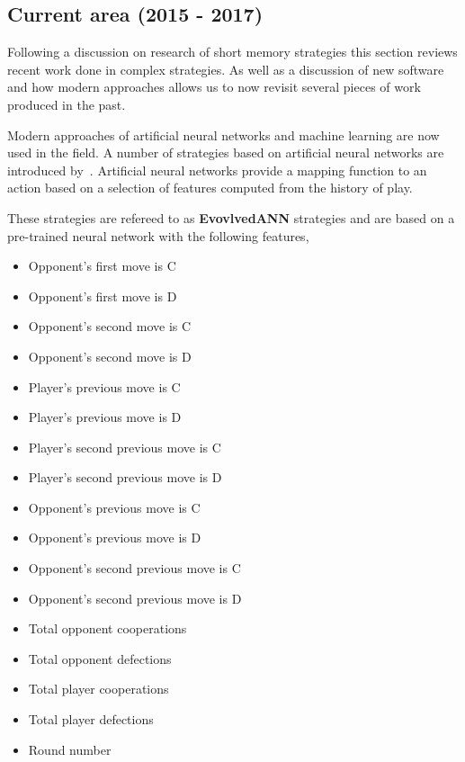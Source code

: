 \documentclass{article}
\begin{document}
\subsection{Current area (2015 - 2017)}

Following a discussion on research of short memory strategies this section
reviews recent work done in complex strategies. As well as a discussion of
new software and how modern approaches allows us to now revisit several pieces of
work produced in the past.

Modern approaches of artificial neural networks and machine learning are now used
in the field.  A number of strategies based on artificial neural networks are
introduced by~\cite{Knight2017}. Artificial neural networks provide a mapping
function to an action based on a selection of features computed from the history
of play.
 
These strategies are refereed to as \textbf{EvovlvedANN} strategies and are
based on a pre-trained neural network with the following features,

\begin{multicols}{2}
    \begin{itemize}
        \item Opponent's first move is C
        \item Opponent's first move is D
        \item Opponent's second move is C
        \item Opponent's second move is D
        \item Player's previous move is C
        \item Player's previous move is D
        \item Player's second previous move is C
        \item Player's second previous move is D
        \item Opponent's previous move is C
        \item Opponent's previous move is D
        \item Opponent's second previous move is C
        \item Opponent's second previous move is D
        \item Total opponent cooperations
        \item Total opponent defections
        \item Total player cooperations
        \item Total player defections
        \item Round number
    \end{itemize}
\end{multicols}
\end{document}
